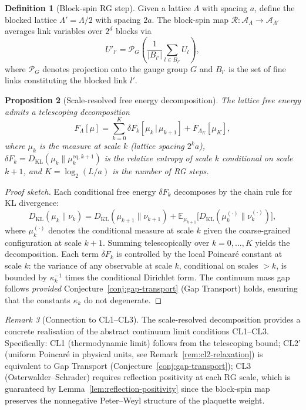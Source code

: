 \documentclass[12pt,a4paper]{article}
\theoremstyle{definition}
\newtheorem{definition}{Definition}[section]
\theoremstyle{plain}
\newtheorem{proposition}[definition]{Proposition}
\theoremstyle{remark}
\newtheorem{remark}[definition]{Remark}
\begin{document}
\begin{definition}[Block-spin RG step]
\label{def:block-rg}
Given a lattice $\Lambda$ with spacing $a$, define the blocked lattice $\Lambda' = \Lambda / 2$ with spacing $2a$. The block-spin map $\mathcal{R}: \mathcal{A}_\Lambda \to \mathcal{A}_{\Lambda'}$ averages link variables over $2^d$ blocks via
\[
U'_{l'} = \mathcal{P}_G\!\left( \frac{1}{|B_{l'}|} \sum_{l \in B_{l'}} U_l \right),
\]
where $\mathcal{P}_G$ denotes projection onto the gauge group $G$ and $B_{l'}$ is the set of fine links constituting the blocked link $l'$.
\end{definition}

\begin{proposition}[Scale-resolved free energy decomposition]
\label{prop:scale-resolved}
The lattice free energy admits a telescoping decomposition
\[
F_\Lambda[\mu] = \sum_{k=0}^{K} \delta F_k[\mu_k \,|\, \mu_{k+1}] + F_{\Lambda_K}[\mu_K],
\]
where $\mu_k$ is the measure at scale $k$ (lattice spacing $2^k a$), $\delta F_k = D_{\mathrm{KL}}(\mu_k \| \mu_k^{\mathrm{eq},k+1})$ is the relative entropy of scale $k$ conditional on scale $k+1$, and $K = \log_2(L/a)$ is the number of RG steps.
\end{proposition}

\begin{proof}[Proof sketch]
Each conditional free energy $\delta F_k$ decomposes by the chain rule for KL divergence:
\[
D_{\mathrm{KL}}(\mu_k \| \nu_k) = D_{\mathrm{KL}}(\mu_{k+1} \| \nu_{k+1}) + \mathbb{E}_{\mu_{k+1}}\!\bigl[D_{\mathrm{KL}}(\mu_k^{(\cdot)} \| \nu_k^{(\cdot)})\bigr],
\]
where $\mu_k^{(\cdot)}$ denotes the conditional measure at scale $k$ given the coarse-grained configuration at scale $k+1$. Summing telescopically over $k = 0, \ldots, K$ yields the decomposition. Each term $\delta F_k$ is controlled by the local Poincar\'e constant at scale $k$: the variance of any observable at scale $k$, conditional on scales $> k$, is bounded by $\kappa_k^{-1}$ times the conditional Dirichlet form. The continuum mass gap follows \emph{provided} Conjecture~\ref{conj:gap-transport} (Gap Transport) holds, ensuring that the constants $\kappa_k$ do not degenerate.
\end{proof}

\begin{remark}[Connection to CL1--CL3]
\label{rem:hierarchical-cl}
The scale-resolved decomposition provides a concrete realisation of the abstract continuum limit conditions CL1--CL3. Specifically: CL1 (thermodynamic limit) follows from the telescoping bound; CL2' (uniform Poincar\'e in physical units, see Remark~\ref{rem:cl2-relaxation}) is equivalent to Gap Transport (Conjecture~\ref{conj:gap-transport}); CL3 (Osterwalder--Schrader) requires reflection positivity at each RG scale, which is guaranteed by Lemma~\ref{lem:reflection-positivity} since the block-spin map preserves the nonnegative Peter--Weyl structure of the plaquette weight.
\end{remark}
\end{document}
